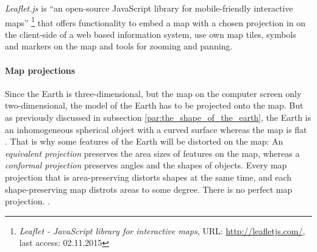 \emph{Leaflet.js} is ``an open-source JavaScript library for mobile-friendly interactive maps''
\footnote{
  \textit{Leaflet - JavaScript library for interactive maps},
  URL: \url{http://leafletjs.com/},
  last access: 02.11.2015
}
that offers functionality to embed a map with a chosen projection in on the client-side of a web based information system, use own map tiles, symbols and markers on the map and tools for zooming and panning.

\paragraph{Map projections} %
\label{par:map_projections}

Since the Earth is three-dimensional, but the map on the computer screen only two-dimensional, the model of the Earth has to be projected onto the map. But as previously discussed in subsection \ref{par:the_shape_of_the_earth}, the Earth is an inhomogeneous spherical object with a curved surface whereas the map is flat
\cite[p.79]{bolstad2008gis}.
That is why some features of the Earth will be distorted on the map: An \emph{equivalent projection} preserves the area sizes of features on the map, whereas a \emph{conformal projection} preserves angles and the shapes of objects. Every map projection that is area-preserving distorts shapes at the same time, and each shape-preserving map distrots areas to some degree. There is no perfect map projection.
\cite{mapProjectionGeokov}.

